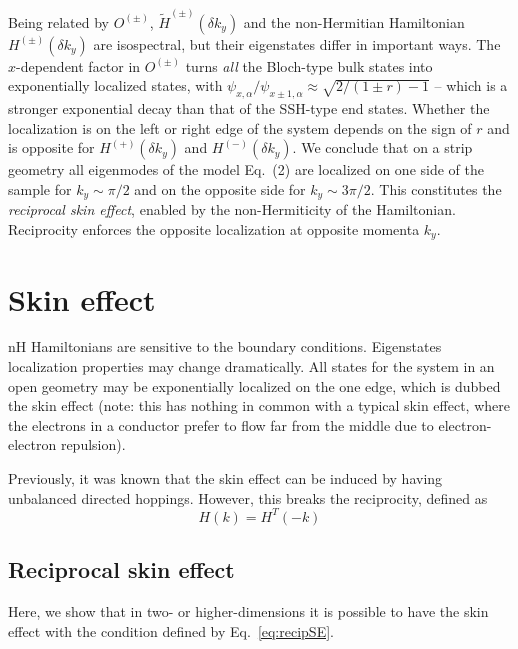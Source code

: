 Being related by $O^{(\pm)}$, $\tilde{H}^{(\pm)}(\delta k_y)$ and the non-Hermitian Hamiltonian $H^{(\pm)}(\delta k_y)$ are isospectral, but their eigenstates differ in important ways. The $x$-dependent factor in $O^{(\pm)}$ turns \emph{all} the Bloch-type bulk states into exponentially localized states, with $\psi_{x,\alpha}/\psi_{x\pm1,\alpha}\approx \sqrt{2/(1\pm r)-1}$ -- which is a stronger exponential decay than that of the SSH-type end states. Whether the localization is on the left or right edge of the system depends on the sign of $r$ and is opposite for $H^{(+)}(\delta k_y)$ and $H^{(-)}(\delta k_y)$. We conclude that on a strip geometry all eigenmodes of the model Eq.~(2) are localized on one side of the sample for $k_y \sim \pi/2$ and on the opposite side for $k_y \sim 3\pi/2$.
This constitutes the \emph{reciprocal skin effect}, enabled by the non-Hermiticity of the Hamiltonian. Reciprocity enforces the opposite localization at opposite momenta $k_y$.

\section{Skin effect}
nH Hamiltonians are sensitive to the boundary conditions. Eigenstates localization properties may change dramatically. All states for the system in an open geometry may be exponentially localized on the one edge, which is dubbed the skin effect (note: this has nothing in common with a typical skin effect, where the electrons in a conductor prefer to flow far from the middle due to electron-electron repulsion).

Previously, it was known that the skin effect can be induced by having unbalanced directed hoppings. However, this breaks the reciprocity, defined as 
\begin{equation}
H (k) = H^{T} (-k)
\label{eq:recipSE}
\end{equation}


\subsection{Reciprocal skin effect}

Here, we show that in two- or higher-dimensions it is possible to have the skin effect with the condition defined by Eq.~\eqref{eq:recipSE}.

